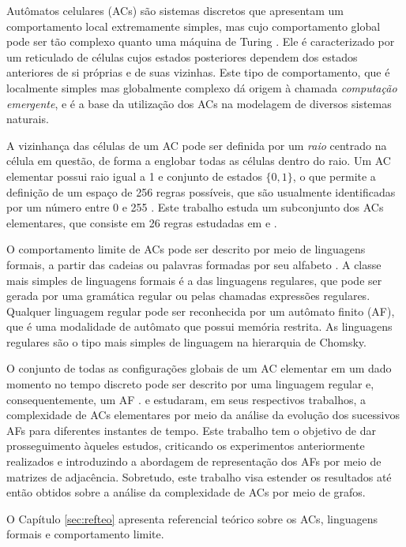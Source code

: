 \documentclass[12pt,a4paper]{article}
\begin{document}
Autômatos celulares (ACs) são sistemas discretos que apresentam um comportamento
local extremamente simples, mas cujo comportamento global pode ser tão
complexo quanto uma máquina de Turing . Ele
é caracterizado por um reticulado de células cujos estados posteriores
dependem dos estados anteriores de si próprias e de suas vizinhas.
Este tipo de comportamento, que é localmente simples mas globalmente
complexo dá origem à chamada \textit{computação emergente}, e é
a base da utilização dos ACs na modelagem de diversos sistemas naturais.

A vizinhança das células de um AC pode ser definida por
um \textit{raio} centrado na célula em questão, de forma a englobar
todas as células dentro do raio. Um AC
elementar possui raio igual a 1 e conjunto de estados $\{0,1\}$, o que
permite a definição de um espaço de 256 regras possíveis, que são
usualmente identificadas por um número entre 0 e 255 .
Este trabalho estuda um subconjunto dos ACs elementares, que consiste
em 26 regras estudadas em  e 
.

O comportamento limite de ACs pode ser descrito por meio
de linguagens formais, a partir das cadeias ou
palavras formadas por seu alfabeto .
A classe mais simples de linguagens formais é
a das linguagens regulares, que pode ser gerada por uma gramática regular ou
pelas chamadas expressões regulares. Qualquer linguagem regular pode ser
reconhecida por um autômato finito (AF), que é uma modalidade de autômato que
possui memória restrita. As linguagens regulares são o tipo mais simples
de linguagem na hierarquia de Chomsky.

O conjunto de todas as configurações globais de um AC
elementar em um dado momento no tempo discreto pode ser descrito por
uma linguagem regular e, consequentemente, um AF
.  e 
estudaram, em seus respectivos trabalhos, a complexidade de ACs
elementares por meio da análise da evolução dos sucessivos
AFs para diferentes instantes de tempo. Este trabalho
tem o objetivo de dar prosseguimento àqueles estudos, criticando os
experimentos anteriormente realizados e introduzindo a abordagem
de representação dos AFs por meio de matrizes de adjacência.
Sobretudo, este trabalho visa estender os resultados até então obtidos
sobre a análise da complexidade de ACs por meio de grafos.

O Capítulo \ref{sec:refteo} apresenta referencial teórico sobre 
os ACs, linguagens formais e comportamento limite.
\end{document}
